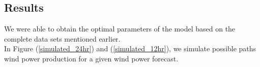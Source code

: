 \documentclass[ima, 25pt, portrait, plainboxedsections]{sciposter}
\begin{document}
\begin{multicols}{3}
%
%
%
%




\section*{Results}
 We were able to obtain the optimal  parameters of the model based on the complete data sets mentioned earlier.\\

 In Figure (\ref{simulated_24hr}) and (\ref{simulated_12hr}), we simulate possible  paths wind power production for a given wind power forecast.



\end{multicols}
\end{document}
